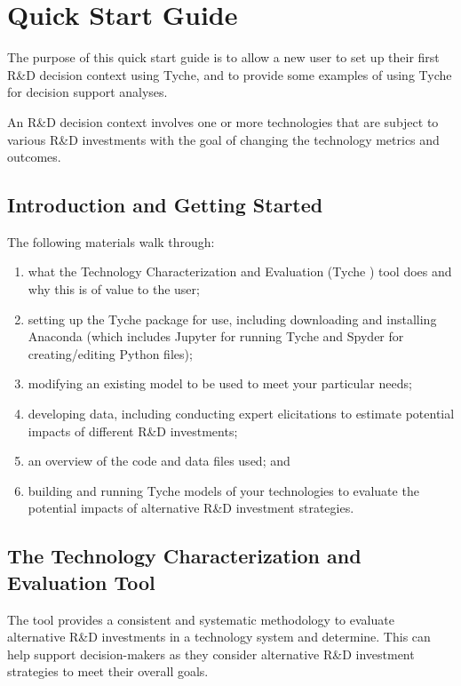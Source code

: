 \documentclass[letterpaper,10pt,english]{sphinxmanual}
\begin{document}
\chapter{Quick Start Guide}
\label{\detokenize{cheat-sheet:quick-start-guide}}\label{\detokenize{cheat-sheet:sec-quickstart}}\label{\detokenize{cheat-sheet::doc}}
The purpose of this quick start guide is to allow a new user to set up their first R\&D decision context using Tyche, and to provide some examples of using Tyche for decision support analyses.

An R\&D decision context involves one or more technologies that are subject to various R\&D investments with the goal of changing the technology metrics and outcomes.


\section{Introduction and Getting Started}
\label{\detokenize{cheat-sheet:introduction-and-getting-started}}
The following materials walk through:
\begin{enumerate}
\def\theenumi{\arabic{enumi}}
\def\labelenumi{\theenumi .}
\makeatletter\def\p@enumii{\p@enumi \theenumi .}\makeatother
\item {} 
what the Technology Characterization and Evaluation (Tyche ) tool does and why this is of value to the user;

\item {} 
setting up the Tyche package for use, including downloading and installing Anaconda (which includes Jupyter for running Tyche and Spyder for creating/editing Python files);

\item {} 
modifying an existing model to be used to meet your particular needs;

\item {} 
developing data, including conducting expert elicitations to estimate potential impacts of different R\&D investments;

\item {} 
an overview of the code and data files used; and

\item {} 
building and running Tyche models of your technologies to evaluate the potential impacts of alternative R\&D investment strategies.

\end{enumerate}


\section{The Technology Characterization and Evaluation Tool}
\label{\detokenize{cheat-sheet:the-technology-characterization-and-evaluation-tool}}
The  tool provides a consistent and systematic methodology to evaluate alternative R\&D investments in a technology system and determine.  This can help support decision-makers as they consider alternative R\&D investment strategies to meet their overall goals.
\end{document}

